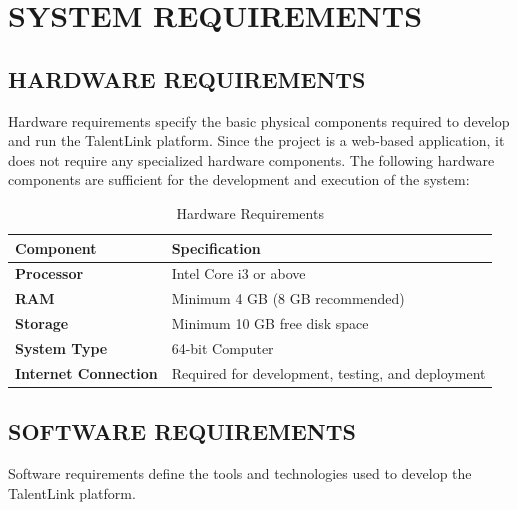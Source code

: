 \documentclass[12pt,a4paper,oneside]{report}
\numberwithin{figure}{chapter}
\numberwithin{table}{chapter}
\begin{document}
\chapter{SYSTEM REQUIREMENTS}

\section{HARDWARE REQUIREMENTS}

Hardware requirements specify the basic physical components required to develop and run
the TalentLink platform. Since the project is a web-based application, it does not require
any specialized hardware components. The following hardware components are sufficient for
the development and execution of the system:

\begin{table}[H]
  \centering
  \caption{Hardware Requirements}
  \begin{tabularx}{0.85\textwidth}{|>{\bfseries}l|X|}
    \hline
    \textbf{Component}       & \textbf{Specification} \\
    \hline
    Processor                & Intel Core i3 or above \\
    \hline
    RAM                      & Minimum 4 GB (8 GB recommended) \\
    \hline
    Storage                  & Minimum 10 GB free disk space \\
    \hline
    System Type              & 64-bit Computer \\
    \hline
    Internet Connection      & Required for development, testing, and deployment \\
    \hline
  \end{tabularx}
  \label{tab:hardware}
\end{table}

\section{SOFTWARE REQUIREMENTS}

Software requirements define the tools and technologies used to develop the TalentLink
platform.
\end{document}
